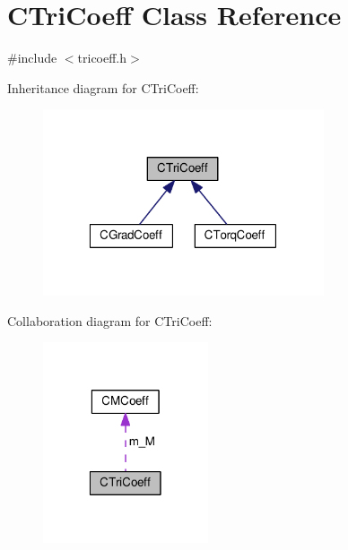 \hypertarget{classCTriCoeff}{\section{C\-Tri\-Coeff Class Reference}
\label{classCTriCoeff}
}


{\ttfamily \#include $<$tricoeff.\-h$>$}



Inheritance diagram for C\-Tri\-Coeff\-:
\nopagebreak
\begin{figure}[H]
\begin{center}
\leavevmode
\includegraphics[width=235pt]{classCTriCoeff__inherit__graph}
\end{center}
\end{figure}


Collaboration diagram for C\-Tri\-Coeff\-:
\nopagebreak
\begin{figure}[H]
\begin{center}
\leavevmode
\includegraphics[width=138pt]{classCTriCoeff__coll__graph}
\end{center}
\end{figure}
